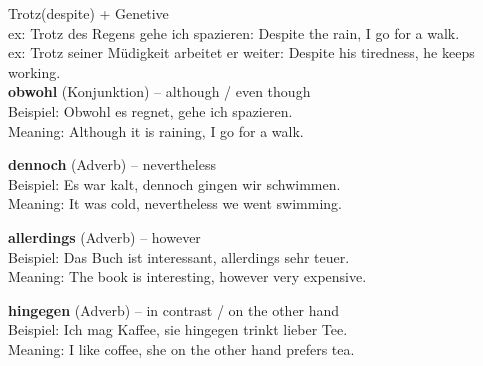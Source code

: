 \documentclass[a4paper]{article}
\title{}
\date{}
\begin{document}
    \maketitle
    Trotz(despite) + Genetive\\
    ex: Trotz des Regens gehe ich spazieren: Despite the rain, I go for a walk.\\
    ex: Trotz seiner Müdigkeit arbeitet er weiter: Despite his tiredness, he keeps working.\\
    
    \textbf{obwohl} (Konjunktion) -- although / even though\\
    Beispiel: Obwohl es regnet, gehe ich spazieren.\\
    Meaning: Although it is raining, I go for a walk.
    
    \bigskip
    
    \textbf{dennoch} (Adverb) -- nevertheless\\
    Beispiel: Es war kalt, dennoch gingen wir schwimmen.\\
    Meaning: It was cold, nevertheless we went swimming.
    
    \bigskip
    
    \textbf{allerdings} (Adverb) -- however\\
    Beispiel: Das Buch ist interessant, allerdings sehr teuer.\\
    Meaning: The book is interesting, however very expensive.
    
    \bigskip
    
    \textbf{hingegen} (Adverb) -- in contrast / on the other hand\\
    Beispiel: Ich mag Kaffee, sie hingegen trinkt lieber Tee.\\
    Meaning: I like coffee, she on the other hand prefers tea.
    
\end{document}
